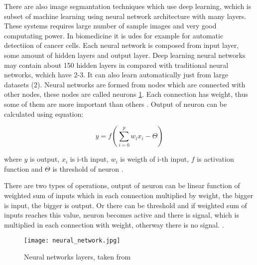         There are also image segmantation techniques which use deep learning, wchich is subset of machine learning using neural network architecture with many layers.
        These systems requires large number of sample images and very good computating power. In biomedicine it is udes for example for automatic detectiion of cancer cells.
        Each neural network is composed from input layer, some amount of hidden layers and output layer. Deep learning neural networks may contain about 150 hidden layers
        in compared with traditional neural networks, wchich have 2-3. It can also learn automatically just from large datasets (2). Neural networks are formed from
        nodes which are connected with other nodes, these nodes are called neurons \ref{fig:neural_networks}. Each connection has weight, thus some of them are more important than others \cite{29}.
        Output of neuron can be calculated using equation:

        \begin{equation}
            y = f(\sum_{i=0}^{p} w_i x_i - \Theta)
        \end{equation}

        where \(y\) is output, \(x_i\) is i-th input, \(w_i\) is weigth of i-th input, \(f\) is activation function and \(\Theta\) is threshold of neuron \cite{29}.

        There are two types of operations, output of neuron can be linear function of weighted sum of inputs which in each connection multiplied by weight, the bigger is input,
        the bigger is output. Or there can be threshold and if weighted sum of inputs reaches this value, neuron becomes active and there is signal, which is multiplied in each
        connection with weight, otherway there is no signal. \cite{29}.

        \begin{figure}[h]
            \texttt{[image: neural\_network.jpg]}
            \caption{Neural networks layers, taken from \cite{20}}
            \label{fig:neural_networks}
        \end{figure}

